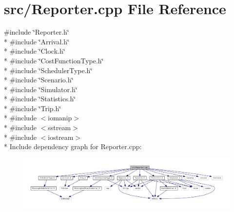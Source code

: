 \section{src/\+Reporter.cpp File Reference}
\label{_reporter_8cpp}
{\ttfamily \#include \char`\"{}Reporter.\+h\char`\"{}}\\*
{\ttfamily \#include \char`\"{}Arrival.\+h\char`\"{}}\\*
{\ttfamily \#include \char`\"{}Clock.\+h\char`\"{}}\\*
{\ttfamily \#include \char`\"{}Cost\+Function\+Type.\+h\char`\"{}}\\*
{\ttfamily \#include \char`\"{}Scheduler\+Type.\+h\char`\"{}}\\*
{\ttfamily \#include \char`\"{}Scenario.\+h\char`\"{}}\\*
{\ttfamily \#include \char`\"{}Simulator.\+h\char`\"{}}\\*
{\ttfamily \#include \char`\"{}Statistics.\+h\char`\"{}}\\*
{\ttfamily \#include \char`\"{}Trip.\+h\char`\"{}}\\*
{\ttfamily \#include $<$iomanip$>$}\\*
{\ttfamily \#include $<$sstream$>$}\\*
{\ttfamily \#include $<$iostream$>$}\\*
Include dependency graph for Reporter.\+cpp\+:
\nopagebreak
\begin{figure}[H]
\begin{center}
\leavevmode
\includegraphics[width=350pt]{_reporter_8cpp__incl}
\end{center}
\end{figure}
